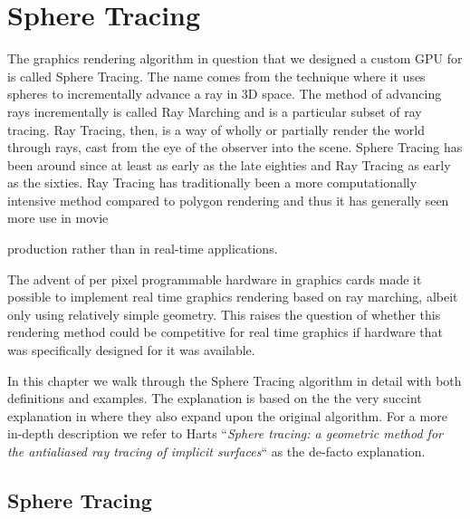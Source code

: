 \chapter{Sphere Tracing}


	The graphics rendering algorithm in question that we designed a custom GPU
	for is called Sphere Tracing\cite{Hart1996}. The name comes from the
	technique where it uses spheres to incrementally advance a ray in 3D space.
	The method of advancing rays incrementally is called Ray Marching and is a
	particular subset of ray tracing\cite{Whitted1980}. Ray Tracing, then, is a
	way of wholly or partially render the world through rays, cast from the eye
	of the observer into the scene. Sphere Tracing has been around since at least
	as early as the late eighties\cite{Hart1989} and Ray Tracing as early as the
	sixties\cite{Appel1968}. Ray Tracing has traditionally been a more
	computationally intensive method compared to polygon
	rendering\cite{Wylie1967} and thus it has generally seen more use in movie

	production rather than in real-time applications.\cite{ref_needed?} 

	The advent of per pixel programmable hardware in graphics cards made it 
	possible to implement real time graphics rendering based on ray	marching, 
	albeit only using relatively simple geometry. This raises the question of 
	whether this rendering method could be competitive for real time graphics 
	if hardware that was specifically designed for it was available.

	In this chapter we walk through the Sphere Tracing algorithm in detail with
	both definitions and examples. The explanation is based on the the very
	succint explanation in \cite{Korndorfer2014} where they also expand upon the
	original algorithm. For a more in-depth description we refer to Harts
	``\emph{Sphere tracing: a geometric method for the antialiased ray tracing
	of implicit surfaces}``\cite{Hart1996} as the de-facto explanation.


	\section{Sphere Tracing} 

